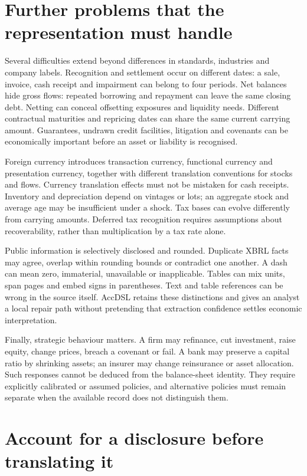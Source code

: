 \section{Further problems that the representation must handle}

Several difficulties extend beyond differences in standards, industries and
company labels. Recognition and settlement occur on different dates: a sale,
invoice, cash receipt and impairment can belong to four periods. Net balances
hide gross flows: repeated borrowing and repayment can leave the same closing
debt. Netting can conceal offsetting exposures and liquidity needs. Different
contractual maturities and repricing dates can share the same current carrying
amount. Guarantees, undrawn credit facilities, litigation and covenants can
be economically important before an asset or liability is recognised.

Foreign currency introduces transaction currency, functional currency and
presentation currency, together with different translation conventions for
stocks and flows. Currency translation effects must not be mistaken for cash
receipts. Inventory and depreciation depend on vintages or lots; an aggregate
stock and average age may be insufficient under a shock. Tax bases can evolve
differently from carrying amounts. Deferred tax recognition requires assumptions
about recoverability, rather than multiplication by a tax rate alone.

Public information is selectively disclosed and rounded. Duplicate XBRL facts
may agree, overlap within rounding bounds or contradict one another. A dash
can mean zero, immaterial, unavailable or inapplicable. Tables can mix units,
span pages and embed signs in parentheses. Text and table references can be
wrong in the source itself. AccDSL retains these distinctions and gives an
analyst a local repair path without pretending that extraction confidence
settles economic interpretation.

Finally, strategic behaviour matters. A firm may refinance, cut investment,
raise equity, change prices, breach a covenant or fail. A bank may preserve a
capital ratio by shrinking assets; an insurer may change reinsurance or asset
allocation. Such responses cannot be deduced from the balance-sheet identity.
They require explicitly calibrated or assumed policies, and alternative
policies must remain separate when the available record does not distinguish
them.

\section{Account for a disclosure before translating it}

